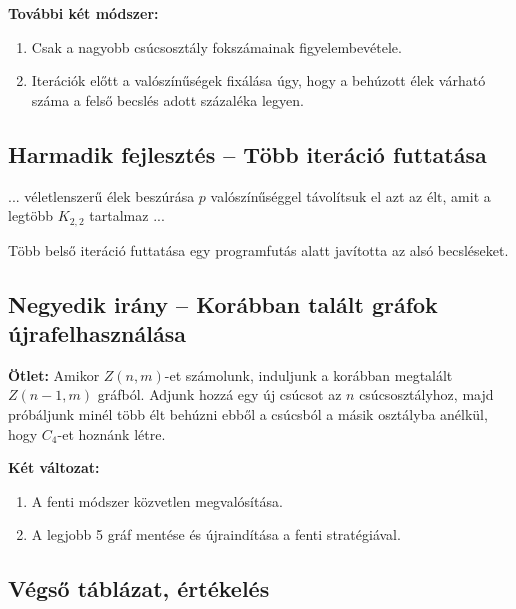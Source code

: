 \documentclass[12pt,a4paper]{article}
\begin{document}
\textbf{További két módszer:}
\begin{enumerate}
    \item Csak a nagyobb csúcsosztály fokszámainak figyelembevétele.
    \item Iterációk előtt a valószínűségek fixálása úgy, hogy a behúzott élek várható száma a felső becslés adott százaléka legyen.
\end{enumerate}

\subsection*{Harmadik fejlesztés – Több iteráció futtatása}
\begin{algorithm}
\begin{algorithmic}[1]
    \State ...
        \State véletlenszerű élek beszúrása $p$ valószínűséggel
            \State távolítsuk el azt az $\text{élt}$, amit a legtöbb $K_{2,2}$ tartalmaz
        \EndWhile
    \EndFor
    \State ...
\end{algorithmic}
\end{algorithm}


Több belső iteráció futtatása egy programfutás alatt javította az alsó becsléseket.

\subsection*{Negyedik irány – Korábban talált gráfok újrafelhasználása}

\textbf{Ötlet:} Amikor $Z(n,m)$-et számolunk, induljunk a korábban megtalált $Z(n-1, m)$ gráfból. Adjunk hozzá egy új csúcsot az $n$ csúcsosztályhoz, majd próbáljunk minél több élt behúzni ebből a csúcsból a másik osztályba anélkül, hogy $C_4$-et hoznánk létre.

\textbf{Két változat:}
\begin{enumerate}
    \item A fenti módszer közvetlen megvalósítása.
    \item A legjobb 5 gráf mentése és újraindítása a fenti stratégiával.
\end{enumerate}

\subsection*{Végső táblázat, értékelés}
\end{document}
